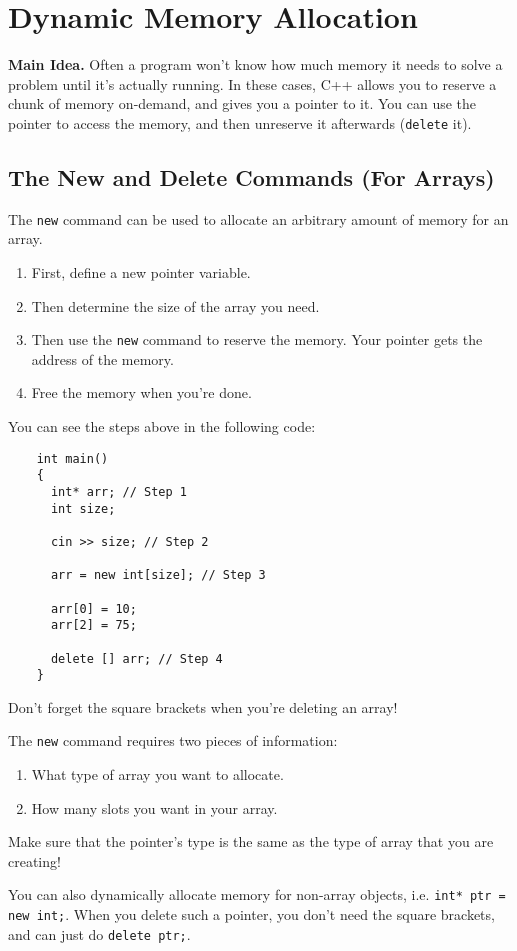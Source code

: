 \documentclass[class=article, crop=false]{standalone}
\begin{document}
  \section{Dynamic Memory Allocation}
  \textbf{Main Idea.} Often a program won't know how much memory it needs to solve a problem until it's actually running. In these cases, C++ allows you to reserve a chunk of memory on-demand, and gives you a pointer to it. You can use the pointer to access the memory, and then unreserve it afterwards (\texttt{delete} it).
  \subsection{The New and Delete Commands (For Arrays)}
  The \texttt{new} command can be used to allocate an arbitrary amount of memory for an array.
  \begin{enumerate}
    \item First, define a new pointer variable.
    \item Then determine the size of the array you need.
    \item Then use the \texttt{new} command to reserve the memory. Your pointer gets the address of the memory.
    \item Free the memory when you're done.
  \end{enumerate}
  You can see the steps above in the following code:
  \begin{lstlisting}
    int main()
    {
      int* arr; // Step 1
      int size;

      cin >> size; // Step 2

      arr = new int[size]; // Step 3

      arr[0] = 10;
      arr[2] = 75;

      delete [] arr; // Step 4
    }
  \end{lstlisting}
  \begin{note}{}
    Don't forget the square brackets when you're deleting an array!
  \end{note}
  The \texttt{new} command requires two pieces of information:
  \begin{enumerate}
    \item What type of array you want to allocate.
    \item How many slots you want in your array.
  \end{enumerate}
  \begin{note}{}
    Make sure that the pointer's type is the same as the type of array that you are creating!
  \end{note}
  You can also dynamically allocate memory for non-array objects, i.e. \texttt{int* ptr = new int;}. When you delete such a pointer, you don't need the square brackets, and can just do \texttt{delete ptr;}.
\end{document}
